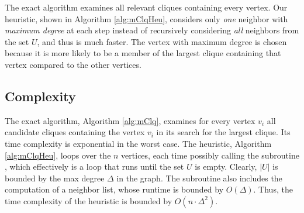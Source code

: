 The exact algorithm examines all relevant cliques containing every vertex.
Our heuristic, shown in Algorithm \ref{alg:mClqHeu}, considers only {\em one} neighbor
with {\em maximum degree} at each step instead of recursively considering {\em all} neighbors 
from the set $U$, and thus is much faster. The vertex with maximum degree is chosen
because it is more likely to be a member of the largest clique containing that vertex
compared to the other vertices.


\subsection{Complexity}
\label{subsec:complexity}

The exact algorithm, Algorithm \ref{alg:mClq}, examines for every vertex $v_i$ all candidate cliques containing the vertex $v_i$ in its search for the largest clique. Its time complexity is exponential in the worst case. The heuristic, Algorithm \ref{alg:mClqHeu}, loops over the $n$ vertices, each time possibly
calling the subroutine \clqh, which effectively is a loop that runs until the set $U$ is empty. 
Clearly, $|U|$ is bounded by the max degree $\Delta$ in the graph.  
The subroutine also includes the computation of a neighbor list, whose runtime is bounded by 
$O(\Delta)$.
Thus, the time complexity of the heuristic is bounded by $O(n\cdot \Delta^{2})$.

